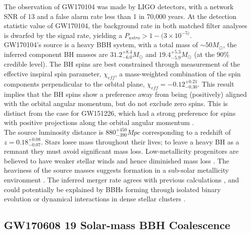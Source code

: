 \documentclass[binding=0.6cm, LaM]{sapthesis}
\begin{document}
	The observation of GW170104 was made by LIGO detectors, 
	with a network SNR of 13 and a false alarm rate less than 1 in 70,000 years.
	At the detection statistic value of GW170104, the background rate in both matched filter 
	analyses is dwarfed by the signal rate, yielding a $P_{astro} > 1 - (3 \times 10^{-5)}$. \\
	GW170104’s source is a heavy BBH system, with a total mass of $\sim50M_\odot$,	
	the inferred component BH masses are $31.2^{+8.4}_{-6.0}M_\odot$ and $19.4^{+5.3} _{-5.9}M_\odot$ (at the 90\% credible level). 
	The BH spins are best constrained through measurement of the effective inspiral spin parameter, $\chi_{eff}$, 
	a mass-weighted combination of the spin components perpendicular to the orbital plane, $\chi_{eff} = −0.12^{+0.21}_{−0.30}$. 
	This result implies that the BH spins show a preference away from being 
	(positively) aligned with the orbital angular momentum, but do not exclude zero spins. 
	This is distinct from the case for GW151226, which had a strong preference 
	for spins with positive projections along the orbital angular momentum \cite{58}. \\
	The source luminosity distance is $880^{+450}_{−390} Mpc$ corresponding to a redshift of $z = 0.18^{+0.08}_{−0.07}$. 
	Stars losee mass throughout their lives; to leave a heavy BH as a remnant 
	they must avoid significant mass loss. 
	Low-metallicity progenitors are believed to have weaker stellar winds and hence diminished mass loss \cite{135}. 
	The heaviness of the source masses suggests formation in a sub-solar metallicity environment \cite{134}. 
	The inferred merger rate agrees with previous calculations \cite{59, 137}, and could potentially be explained 	
	by BBHs forming through isolated binary evolution or dynamical interactions in dense stellar clusters \cite{134}. 

\subsection{GW170608 19 Solar-mass BBH Coalescence}
\end{document}
